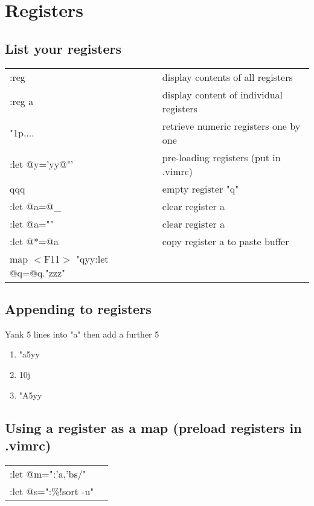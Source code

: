 \section{Registers}

\subsection{List your registers}
\begin{center}
\begin{longtable}{l|l}
:reg & display contents of all registers\\
:reg a & display content of individual registers\\
"1p.... & retrieve numeric registers one by one\\
:let @y='yy@"' & pre-loading registers (put in .vimrc)\\
qqq & empty register "q"\\
:let @a=@\_ & clear register a\\
:let @a="" & clear register a\\
:let @*=@a & copy register a to paste buffer\\
map $<$F11$>$ "qyy:let @q=@q."zzz"
\end{longtable}
\end{center}

\subsection{Appending to registers}

Yank 5 lines into "a" then add a further 5\\
\begin{enumerate}
\item "a5yy
\item 10j
\item "A5yy
\end{enumerate}

\subsection{Using a register as a map (preload registers in .vimrc)}
\begin{center}
\begin{longtable}{l|l}
 :let @m=":'a,'bs/"\\
 :let @s=":\%!sort -u"
 \end{longtable}
\end{center}

